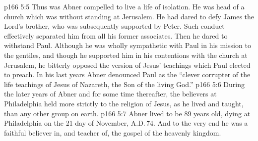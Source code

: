 \vs p166 5:5 Thus was Abner compelled to live a life of isolation. He was head of a church which was without standing at Jerusalem. He had dared to defy James the Lord’s brother, who was subsequently supported by Peter. Such conduct effectively separated him from all his former associates. Then he dared to withstand Paul. Although he was wholly sympathetic with Paul in his mission to the gentiles, and though he supported him in his contentions with the church at Jerusalem, he bitterly opposed the version of Jesus’ teachings which Paul elected to preach. In his last years Abner denounced Paul as the “clever corrupter of the life teachings of Jesus of Nazareth, the Son of the living God.”
\vs p166 5:6 During the later years of Abner and for some time thereafter, the believers at Philadelphia held more strictly to the religion of Jesus, as he lived and taught, than any other group on earth.
\vs p166 5:7 Abner lived to be 89 years old, dying at Philadelphia on the 21 day of November, A.D.\,74. And to the very end he was a faithful believer in, and teacher of, the gospel of the heavenly kingdom.
\quizlink
